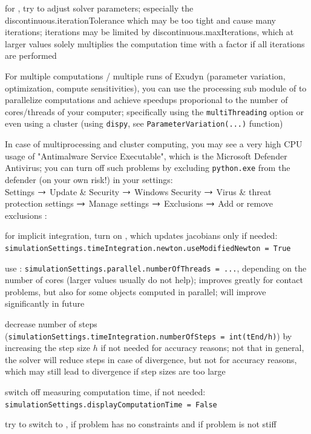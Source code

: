   \item for , try to adjust solver parameters; especially the discontinuous.iterationTolerance which may be too tight and cause many iterations; iterations may be limited by discontinuous.maxIterations, which at larger values solely multiplies the computation time with a factor if all iterations are performed
  \item For multiple computations / multiple runs of Exudyn (parameter variation, optimization, compute sensitivities), you can use the processing sub module of \codeName to parallelize computations and achieve speedups proporional to the number of cores/threads of your computer; specifically using the \texttt{multiThreading} option or even using a cluster (using \texttt{dispy}, see \texttt{ParameterVariation(...)} function)
  \item In case of multiprocessing and cluster computing, you may see a very high CPU usage of "Antimalware Service Executable", which is the Microsoft Defender Antivirus; you can turn off such problems by excluding \texttt{python.exe} from the defender (on your own risk!) in your settings:\\
  Settings $\rightarrow$ Update \& Security $\rightarrow$ Windows Security $\rightarrow$ Virus \& threat protection settings $\rightarrow$ Manage settings $\rightarrow$ Exclusions $\rightarrow$ Add or remove exclusions 
\ei
%
:
\bi
  \item for implicit integration, turn on , which updates jacobians only if needed: \texttt{simulationSettings.timeIntegration.newton.useModifiedNewton = True}
  \item use : \texttt{simulationSettings.parallel.numberOfThreads = ...}, depending on the number of cores (larger values usually do not help); improves greatly for contact problems, but also for some objects computed in parallel; will improve significantly in future
  \item decrease number of steps (\texttt{simulationSettings.timeIntegration.numberOfSteps = int(tEnd/h)}) by increasing the step size $h$ if not needed for accuracy reasons; not that in general, the solver will reduce steps in case of divergence, but not for accuracy reasons, which may still lead to divergence if step sizes are too large
  \item switch off measuring computation time, if not needed: \texttt{simulationSettings.displayComputationTime = False}
  \item try to switch to , if problem has no constraints and if problem is not stiff

